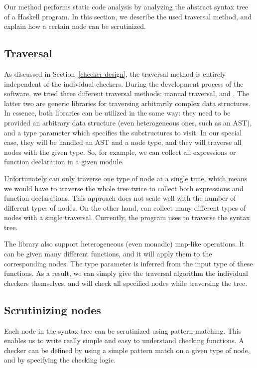\documentclass[main.tex]{subfiles}
\begin{document}
	Our method performs static code analysis by analyzing the abstract syntax tree of a Haskell program. In this section, we describe the used traversal method, and explain how a certain node can be scrutinized.
	
	\subsection{Traversal}
	
	As discussed in Section~\ref{checker-design}, the traversal method is entirely independent of the individual checkers. During the development process of the software, we tried three different traversal methods: manual traversal,  and . The latter two are generic libraries for traversing arbitrarily complex data structures. In essence, both libraries can be utilized in the same way: they need to be provided an arbitrary data structure (even heterogeneous ones, such as an AST), and a type parameter which specifies the substructures to visit. In our special case, they will be handled an AST and a node type, and they will traverse all nodes with the given type. So, for example, we can collect all expressions or function declaration in a given module.
	
	Unfortunately  can only traverse one type of node at a single time, which means we would have to traverse the whole tree twice to collect both expressions and function declarations. This approach does not scale well with the number of different types of nodes. On the other hand,  can collect many different types of nodes with a single traversal. Currently, the program uses  to traverse the syntax tree.
	
	The library also support heterogeneous (even monadic) map-like operations. It can be given many different functions, and it will apply them to the corresponding nodes. The type parameter is inferred from the input type of these functions. As a result, we can simply give the traversal algorithm the individual checkers themselves, and  will check all specified nodes while traversing the tree.
	
	\subsection{Scrutinizing nodes}
	
	Each node in the syntax tree can be scrutinized using pattern-matching. This enables us to write really simple and easy to understand checking functions. A checker can be defined by using a simple pattern match on a given type of node, and by specifying the checking logic.
	
\end{document}

